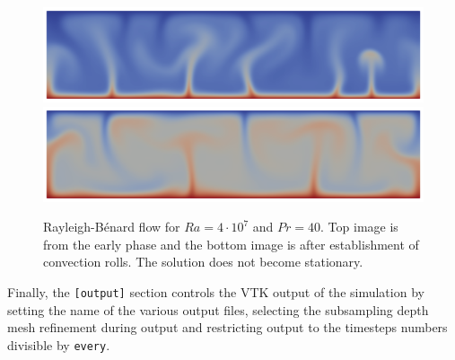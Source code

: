 \documentclass[a4paper,12pt]{article}
\theoremstyle{definition}
\begin{document}
\begin{figure}
\begin{center}
\includegraphics[width=\textwidth]{rayleighbenard1.png}\\
\includegraphics[width=\textwidth]{rayleighbenard2.png}
\end{center}
\caption{Rayleigh-Bénard flow for $Ra=4\cdot 10^7$ and $Pr=40$. Top image is from the early phase and the
bottom image is after establishment of convection rolls. The solution does not become stationary.}
\end{figure}

Finally, the \lstinline{[output]} section controls the VTK output of the simulation by setting the name of the
various output files, selecting the subsampling depth mesh refinement during output and restricting output to the 
timesteps numbers divisible by \lstinline{every}.
\end{document}
